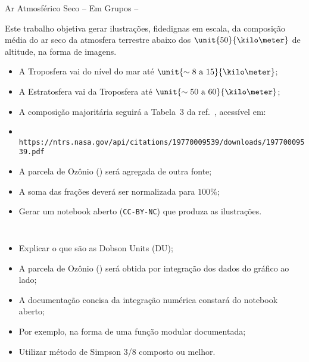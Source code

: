     \begin{frame}[allowframebreaks]{Ar Atmosférico Seco -- Em Grupos -- }\vspace*{-0em}
        
        Este trabalho objetiva gerar \alert{ilustrações}, \alert{fidedignas em escala}, da
        composição média do \alert{ar seco} da atmosfera terrestre abaixo dos
        \alert{$\unit{50}{\kilo\meter}$ de altitude}, na forma de \alert{imagens}.
        \\[\medskipamount]

        \begin{itemize}
            \item A \alert{Troposfera} vai do nível do mar \alert{até $\unit{\sim{8}\mbox{ a
                }15}{\kilo\meter}$};
            \item A \alert{Estratosfera} vai da Troposfera \alert{até $\unit{\sim{50}\mbox{ a
                }60}{\kilo\meter}$};
            \item A composição \alert{majoritária} seguirá a \alert{Tabela~3} da
                ref.~\cite{1976-NASA-TechRep-US_Std_Atm}, acessível em:
            \item {\scriptsize\tt
                https://ntrs.nasa.gov/api/citations/19770009539/downloads/19770009539.pdf}
            \item A parcela de \alert{Ozônio ()} será agregada de outra fonte;
            \item A soma das frações deverá ser \alert{normalizada para $\unit{100}{\%}$};
            \item Gerar um \alert{notebook} aberto (\alert{\tt CC-BY-NC}) que produza as
                ilustrações.
        \end{itemize}

        \pagebreak

        \begin{columns}
            \begin{itemize}
                \item Explicar o que são as \alert{Dobson Units (DU)};
                \item A parcela de \alert{Ozônio ()} será obtida por \alert{integração}
                    dos dados do gráfico ao lado;
                \item A documentação \alert{concisa} da integração numérica constará do
                    \alert{notebook aberto};
                \item Por exemplo, na forma de uma \alert{função} modular documentada;
                \item Utilizar método de \alert{Simpson 3/8 composto} ou melhor.
            \end{itemize}
        \end{columns}


\end{frame}
